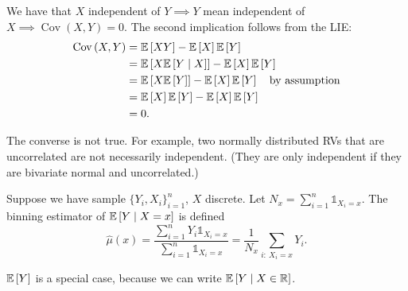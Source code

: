 \begin{proposition}	We have that $X$ independent of $Y \implies Y$ mean independent of $X \implies \operatorname{Cov}\left(X,Y\right) = 0$.
	The second implication follows from the LIE:
	\begin{align*}
		\operatorname{Cov}\left(X,Y\right) & = \mathbb{E}\left[XY\right] - \mathbb{E}\left[X\right] \mathbb{E}\left[Y\right]                                             \\
		                                   & = \mathbb{E}\left[X \mathbb{E}\left[Y \mid X\right] \right]  - \mathbb{E}\left[X\right]  \mathbb{E}\left[Y\right]                   \\
		                                   & = \mathbb{E}\left[X \mathbb{E}\left[Y\right] \right] - \mathbb{E}\left[X\right] \mathbb{E}\left[Y\right] \quad \text{by assumption} \\
		                                   & = \mathbb{E}\left[X\right] \mathbb{E}\left[Y\right] - \mathbb{E}\left[X\right] \mathbb{E}\left[Y\right]                             \\
		                                   & = 0
		.\end{align*}

	The converse is not true.
	For example, two normally distributed RVs that are uncorrelated are not necessarily independent. (They are only independent if they are bivariate normal and uncorrelated.)
\end{proposition}

\begin{definition}
	Suppose we have sample $\{Y_i, X_i\}_{i=1}^{n}$, $X$ discrete. Let $N_x = \sum_{i=1}^{n}\mathds{1}_{X_i = x}$.
	The binning estimator of $\mathbb{E}\left[Y \mid X = x\right] $ is defined \[
		\hat{\mu}(x) = \frac{\sum_{i=1}^{n}Y_i \mathds{1}_{X_i = x}}{\sum_{i=1}^{n}\mathds{1}_{X_i = x}} = \frac{1}{N_x} \sum_{i:\ X_i = x} Y_i
		.\]

	$\mathbb{E}\left[Y\right] $ is a special case, because we can write $\mathbb{E}\left[Y \mid X \in \mathbb{R}\right] $.
\end{definition}

